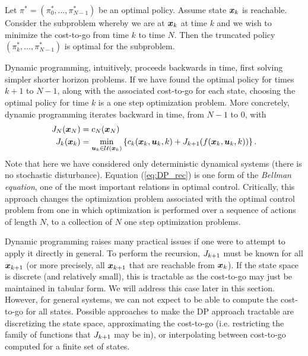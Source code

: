 \begin{theorem}
Let $\pi^* = (\pi_0^*, \ldots, \pi^*_{N-1})$ be an optimal policy. Assume state $\bm{x}_k$ is reachable. Consider the subproblem whereby we are at $\bm{x}_k$ at time $k$ and we wish to minimize the cost-to-go from time $k$ to time $N$. Then the truncated policy $(\pi_k^*, \ldots, \pi^*_{N-1})$ is optimal for the subproblem.
\end{theorem}

Dynamic programming, intuitively, proceeds backwards in time, first solving simpler shorter horizon problems. If we have found the optimal policy for times $k+1$ to $N-1$, along with the associated cost-to-go for each state, choosing the optimal policy for time $k$ is a one step optimization problem. More concretely, dynamic programming iterates backward in time, from $N-1$ to $0$, with
\begin{align}
    J_N(\bm{x}_N) &= c_N(\bm{x}_N)\\
    J_k(\bm{x}_k) &= \min_{\bm{u}_k \in \mathcal{U}(\bm{x}_k)} \left\{ c_k(\bm{x}_k,\bm{u}_k,k) + J_{k+1}(f(\bm{x}_k,\bm{u}_k,k)) \right\}.
    \label{eq:DP_rec}
\end{align}
Note that here we have considered only deterministic dynamical systems (there is no stochastic disturbance). Equation (\ref{eq:DP_rec}) is one form of the \textit{Bellman equation}, one of the most important relations in optimal control. Critically, this approach changes the optimization problem associated with the optimal control problem from one in which optimization is performed over a sequence of actions of length $N$, to a collection of $N$ one step optimization problems. 

Dynamic programming raises many practical issues if one were to attempt to apply it directly in general. To perform the recursion, $J_{k+1}$ must be known for all $\bm{x}_{k+1}$ (or more precisely, all $\bm{x}_{k+1}$ that are reachable from $\bm{x}_k$). If the state space is discrete (and relatively small), this is tractable as the cost-to-go may just be maintained in tabular form. We will address this case later in this section. However, for general systems, we can not expect to be able to compute the cost-to-go for all states. Possible approaches to make the DP approach tractable are discretizing the state space, approximating the cost-to-go (i.e. restricting the family of functions that $J_{k+1}$ may be in), or interpolating between cost-to-go computed for a finite set of states. 

